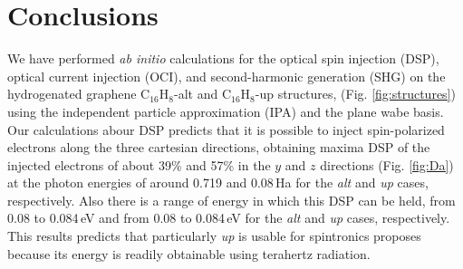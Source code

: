 \documentclass[pss]{wiley2sp} %
\begin{document}


\section{Conclusions}\label{sec:conclusions}

We have performed \emph{ab initio} calculations for the optical spin injection (DSP), optical current injection (OCI), and second-harmonic generation (SHG) on the hydrogenated graphene C$_{16}$H$_{8}$-alt and C$_{16}$H$_{8}$-up structures, (Fig. \ref{fig:structures}) using the independent particle approximation (IPA) and the plane wabe basis. Our calculations abour DSP predicts that it is possible to inject spin-polarized electrons along the three cartesian directions, obtaining maxima DSP of the injected electrons of about 39\% and 57\% in the $y$ and $z$ directions  (Fig. \ref{fig:Da}) at the photon energies of around 0.719 and 0.08\,Ha  for the \emph{alt} and \emph{up} cases, respectively. Also there is a range of energy in which this DSP can be held, from 0.08 to 0.084\,eV and from 0.08 to 0.084\,eV for the \emph{alt} and \emph{up} cases, respectively. This results predicts that particularly \emph{up} is usable for spintronics proposes because its energy is readily obtainable using terahertz radiation.
\end{document}
